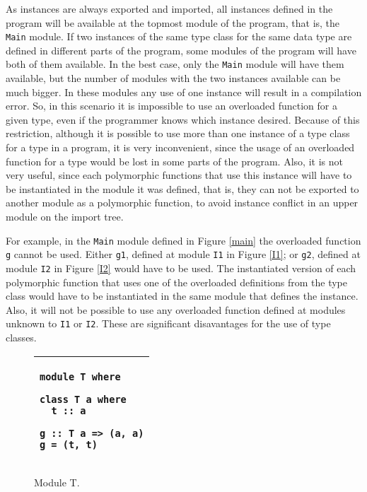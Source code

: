 \documentclass[msc]{ppgccufmg}
\begin{document}
As instances are always exported and imported, all instances defined in the
program will be available at the topmost module of the program, that is, the
\texttt{Main} module.  If two instances of the same type class for the same
data type are defined in different parts of the program, some modules of the
program will have both of them available.  In the best case, only the
\texttt{Main} module will have them available, but the number of modules with
the two instances available can be much bigger.  In these modules any use of
one instance will result in a
compilation error.  So, in this scenario it is impossible to use an overloaded
function for a given type, even if the programmer knows which instance desired.  Because of this restriction, although it is possible
to use more than one instance of a type class for a type in a program, it is
very inconvenient, since the usage of an overloaded function for a type would be
lost in some parts of the program.  Also, it is not very useful, since each polymorphic
  functions that use this instance will have to be instantiated in the module it was defined, that is, they can not be exported to another module as a polymorphic function,
  to avoid instance conflict in an upper module on the import tree.

For example, in the \texttt{Main} module defined
in Figure \ref{main} the overloaded function \texttt{g} cannot be used.  Either
\texttt{g1}, defined at module \texttt{I1} in Figure \ref{I1}; or \texttt{g2},
defined at module \texttt{I2} in Figure \ref{I2} would have to be used.  The
instantiated version of each polymorphic function that uses one of the overloaded
definitions from the type class would have to be instantiated in the same module
that defines the instance.  Also, it will not be possible to use any overloaded
function defined at modules unknown to \texttt{I1} or \texttt{I2}.  These are significant disavantages for the use of type classes.

\begin{figure}
\caption{Module T.\label{T}}
\begin{tabular}{|p{\textwidth}|}
\hline
\begin{verbatim}
module T where

class T a where
  t :: a

g :: T a => (a, a)
g = (t, t)
\end{verbatim}
\\
\hline
\end{tabular}
\end{figure}
\end{document}

